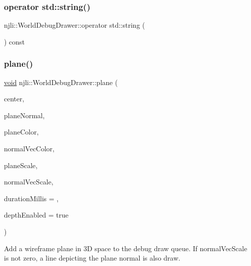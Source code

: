\mbox{\label{classnjli_1_1_world_debug_drawer_ad8b4bbf6151d5f233dce54b012d9f395}} 
\subsubsection{\texorpdfstring{operator std\+::string()}{operator std::string()}}
{\footnotesize\ttfamily njli\+::\+World\+Debug\+Drawer\+::operator std\+::string (\begin{DoxyParamCaption}{ }\end{DoxyParamCaption}) const}

\mbox{\label{classnjli_1_1_world_debug_drawer_a7a947904ddfe6665fc69fc9d04017f23}} 
\subsubsection{\texorpdfstring{plane()}{plane()}}
{\footnotesize\ttfamily \mbox{\hyperlink{_thread_8h_af1e856da2e658414cb2456cb6f7ebc66}{void}} njli\+::\+World\+Debug\+Drawer\+::plane (\begin{DoxyParamCaption}\item[{const bt\+Vector3 \&}]{center,  }\item[{const bt\+Vector3 \&}]{plane\+Normal,  }\item[{const bt\+Vector3 \&}]{plane\+Color,  }\item[{const bt\+Vector3 \&}]{normal\+Vec\+Color,  }\item[{float}]{plane\+Scale,  }\item[{float}]{normal\+Vec\+Scale,  }\item[{int}]{duration\+Millis = {},  }\item[{bool}]{depth\+Enabled = {\ttfamily true} }\end{DoxyParamCaption})}

Add a wireframe plane in 3D space to the debug draw queue. If \textquotesingle{}normal\+Vec\+Scale\textquotesingle{} is not zero, a line depicting the plane normal is also draw.


